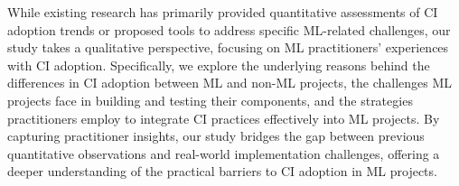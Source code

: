 While existing research has primarily provided quantitative assessments of CI adoption trends or proposed tools to address specific ML-related challenges, our study takes a qualitative perspective, focusing on ML practitioners' experiences with CI adoption. Specifically, we explore the underlying reasons behind the differences in CI adoption between ML and non-ML projects, the challenges ML projects face in building and testing their components, and the strategies practitioners employ to integrate CI practices effectively into ML projects. By capturing practitioner insights, our study bridges the gap between previous quantitative observations and real-world implementation challenges, offering a deeper understanding of the practical barriers to CI adoption in ML projects.

